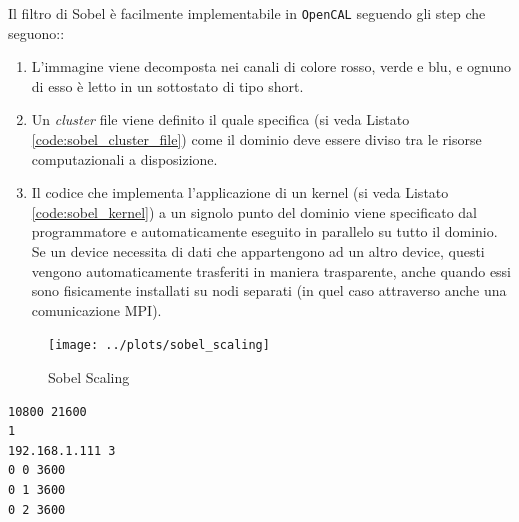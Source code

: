 Il filtro di Sobel è facilmente implementabile in \texttt{OpenCAL} seguendo gli step che seguono::
\begin{enumerate}
	\item L'immagine viene decomposta nei canali di colore rosso, verde e blu, e ognuno di esso è letto in un sottostato di tipo short.
	\item Un \textit{cluster} file viene definito il quale specifica (si veda Listato \ref{code:sobel_cluster_file}) come il dominio deve essere diviso tra le risorse computazionali a disposizione.
	\item Il codice che implementa l'applicazione di un kernel (si veda Listato \ref{code:sobel_kernel}) a un signolo punto del dominio viene specificato dal programmatore e automaticamente eseguito in parallelo su tutto il dominio. Se un device necessita di dati che appartengono ad un altro device, questi vengono automaticamente trasferiti in maniera trasparente, anche quando essi sono fisicamente installati su nodi separati (in quel caso attraverso anche una comunicazione MPI).
\end{enumerate}
\begin{figure}
	\centering
	\caption{Sobel Scaling}
	\label{fig:sobel_scaling}
	\texttt{[image: ../plots/sobel\_scaling]}
\end{figure}
\begin{lstlisting}[float]
10800 21600
1
192.168.1.111 3
0 0 3600
0 1 3600
0 2 3600
\end{lstlisting}

